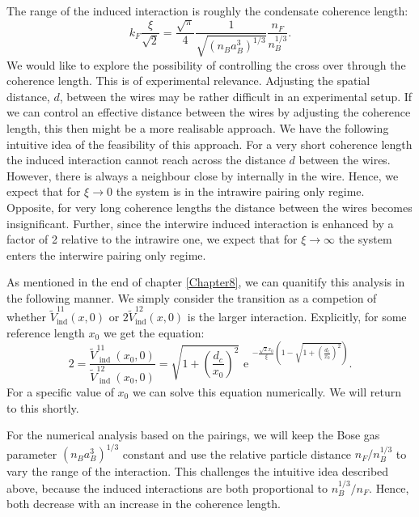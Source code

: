 The range of the induced interaction is roughly the condensate coherence length:
\begin{equation}
k_F\frac{\xi}{\sqrt{2}} = \frac{\sqrt{\pi}}{4}\frac{1}{\sqrt{(n_Ba_B^3)^{1/3}}}\frac{n_F}{n_B^{1/3}}.
\label{eq.RangefunctionofrBBnB}
\end{equation}
We would like to explore the possibility of controlling the cross over through the coherence length. This is of experimental relevance. Adjusting the spatial distance, $d$, between the wires may be rather difficult in an experimental setup. If we can control an effective distance between the wires by adjusting the coherence length, this then might be a more realisable approach. We have the following intuitive idea of the feasibility of this approach. For a very short coherence length the induced interaction cannot reach across the distance $d$ between the wires. However, there is always a neighbour close by internally in the wire. Hence, we expect that for $\xi \to 0$ the system is in the intrawire pairing only regime. Opposite, for very long coherence lengths the distance between the wires becomes insignificant. Further, since the interwire induced interaction is enhanced by a factor of 2 relative to the intrawire one, we expect that for $\xi \to \infty$ the system enters the interwire pairing only regime. 

As mentioned in the end of chapter \ref{Chapter8}, we can quanitify this analysis in the following manner. We simply consider the transition as a competion of whether $\tilde{V}^{11}_{\text{ind}}(x,0)$ or $2\tilde{V}^{12}_{\text{ind}}(x,0)$ is the larger interaction. Explicitly, for some reference length $x_0$ we get the equation:
\begin{equation}
2 = \frac{ \tilde{V}^{11}_{\text{ ind }}(x_0, 0) }{ \tilde{V}^{12}_{\text{ ind }}(x_0, 0) } = \sqrt{ 1 + \left( \frac{ d_c }{ x_0 } \right)^2 }\text{ e }^{ -\frac{ \sqrt{2}x_0 }{ \xi } \left( 1 - \sqrt{ 1 + \left( \frac{ d_c }{ x_0 } \right)^2 } \right) }.
\label{eq.2wires.Vequal}
\end{equation}
For a specific value of $x_0$ we can solve this equation numerically. We will return to this shortly.  

For the numerical analysis based on the pairings, we will keep the Bose gas parameter $(n_Ba_B^3)^{1/3}$ constant and use the relative particle distance $n_F/n_B^{1/3}$ to vary the range of the interaction. This challenges the intuitive idea described above, because the induced interactions are both proportional to $n_B^{1/3}/n_F$. Hence, both decrease with an increase in the coherence length. 

